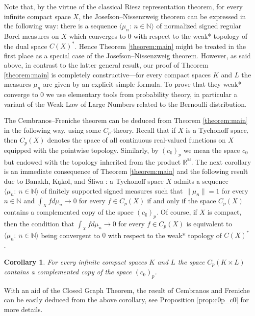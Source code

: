 \documentclass[11pt]{amsart}
\newtheorem{corollary}[theorem]{Corollary}
\theoremstyle{definition}
\theoremstyle{remark}
\numberwithin{equation}{section}
\newcommand{\N}{\mathbb{N}}
\newcommand{\R}{\mathbb{R}}
\newcommand{\seqn}[1]{\big\langle#1\colon\ n\io\big\rangle}
\newcommand{\io}{\in\mathbb{N}}%
\begin{document}
Note that, by the virtue of the classical Riesz representation theorem, for every infinite compact space $X$, the Josefson--Nissenzweig theorem can be expressed in the following way: there is a sequence $\seqn{\mu_n}$ of normalized signed regular Borel measures on $X$ which converges to $0$ with respect to the weak* topology of the dual space $C(X)^*$. Hence Theorem \ref{theorem:main} might be treated in the first place as a special case of the Josefson--Nissenzweig theorem. However, as said above, in contrast to the latter general result, our proof of Theorem \ref{theorem:main} is completely constructive---for every compact spaces $K$ and $L$ the measures $\mu_n$ are given by an explicit simple formula. To prove that they weak* converge to $0$ we use elementary tools from probability theory, in particular a variant of the Weak Law of Large Numbers related to the Bernoulli distribution.

The Cembranos--Freniche theorem can be deduced from Theorem \ref{theorem:main} in the following way, using some $C_p$-theory. Recall that if $X$ is a Tychonoff space, then $C_p(X)$ denotes the space of all continuous real-valued functions on $X$ equipped with the pointwise topology. Similarly, by $(c_0)_p$ we mean the space $c_0$ but endowed with the topology inherited from the product $\R^\N$. The next corollary is an immediate consequence of Theorem \ref{theorem:main} and the following result due to Banakh, K\k{a}kol, and \'{S}liwa \cite[Theorem 1]{BKS19}: a Tychonoff space $X$ admits a sequence $\seqn{\mu_n}$ of finitely supported signed measures such that $\big\|\mu_n\big\|=1$ for every $n\io$ and $\int_Xfd\mu_n\to0$ for every $f\in C_p(X)$ if and only if the space $C_p(X)$ contains a complemented copy of the space $(c_0)_p$. Of course, if $X$ is compact, then the condition that $\int_Xfd\mu_n\to0$ for every $f\in C_p(X)$ is equivalent to $\seqn{\mu_n}$ being convergent to $0$ with respect to the weak* topology of $C(X)^*$.

\begin{corollary}\label{cor:main}
For every infinite compact spaces $K$ and $L$ the space $C_p(K\times L)$ contains a complemented copy of the space $(c_0)_p$.
\end{corollary}

\noindent With an aid of the Closed Graph Theorem, the result of Cembranos and Freniche can be easily deduced from the above corollary, see Proposition \ref{prop:c0p_c0} for more details.
\end{document}

